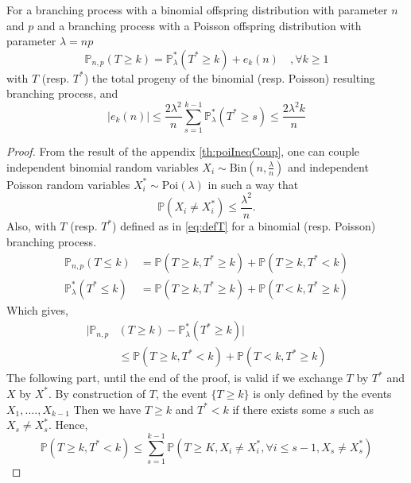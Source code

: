 \begin{theorem}\label{th:poibin}
For a branching process with a binomial offspring distribution with parameter $n$ and $p$ and a branching process with a Poisson offspring distribution with parameter $\lambda = np$
	\begin{equation}
		\mathbb{P}_{n,p}(T \geq k) = \mathbb{P}_{\lambda}^*(T^* \geq k) + e_k(n)\quad, \forall k \geq 1
	\end{equation}
	with $T$ (resp. $T^*$) the total progeny of the binomial (resp. Poisson) resulting branching process, and 
	\begin{equation}
		|e_k(n)| \leq \frac{2\lambda ^2}{n}\sum_{s=1}^{k-1} \mathbb{P}_{\lambda}^*(T^* \geq s) \leq \frac{2\lambda ^2k}{n}
	\end{equation}
\end{theorem}
\begin{proof}
	From the result of the appendix \ref{th:poiIneqCoup}, one can couple independent binomial random variables $X_i \sim \text{Bin}(n, \frac{\lambda}{n})$
	and independent Poisson random variables $X_i^* \sim \text{Poi}(\lambda)$ in such a way that
	\begin{equation}
		\mathbb{P}(X_i \neq X_i^*) \leq \frac{\lambda^2}{n}.
	\end{equation}
	Also, with $T$ (resp. $T^*$) defined as in \eqref{eq:defT} for a binomial (resp. Poisson) branching process.
	\begin{align}
		\mathbb{P}_{n,p}(T\leq k) &= \mathbb{P}(T\geq k, T^* \geq k) +\mathbb{P}(T\geq k, T^* < k)\\
		\mathbb{P}_{\lambda}^*(T^*\leq k) &= \mathbb{P}(T\geq k, T^* \geq k) +\mathbb{P}(T< k, T^* \geq k)
	\end{align}
	Which gives,
	\begin{align}
		|\mathbb{P}_{n, p}&(T \geq k) -\mathbb{P}_{\lambda}^*(T^* \geq k)|\\
				  &\leq  \mathbb{P}(T\geq k, T^* < k) +\mathbb{P}(T< k, T^* \geq k)
	\end{align}
	The following part, until the end of the proof, is valid if we exchange $T$ by $T^*$ and $X$ by $X^*$.
	\newline
	By construction of $T$, the event $\{T\geq k\}$ is only defined by the events $X_1, ...., X_{k-1}$
	Then we have $T\geq k$ and $T^*<k$ if there exists some $s$ such as $X_s \neq X_s^*$.
	Hence, 
	\begin{equation}
		\mathbb{P}(T\geq k, T^*<k) \leq \sum_{s=1}^{k-1}\mathbb{P}(T \geq K, X_i \neq X_i^*, \forall i \leq s-1, X_s \neq X_s^*)

\end{equation}
\end{proof}
